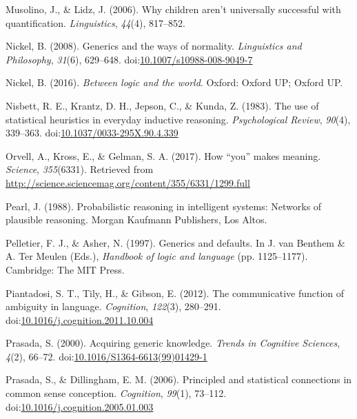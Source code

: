 \documentclass[english,,man,floatsintext]{apa6}
\theoremstyle{definition}
\theoremstyle{definition}
\theoremstyle{definition}
\theoremstyle{remark}
\begin{document}
\leavevmode\hypertarget{ref-Musolino2006}{}%
Musolino, J., \& Lidz, J. (2006). Why children aren't universally
successful with quantification. \emph{Linguistics}, \emph{44}(4),
817--852.

\leavevmode\hypertarget{ref-Nickel2008}{}%
Nickel, B. (2008). Generics and the ways of normality. \emph{Linguistics
and Philosophy}, \emph{31}(6), 629--648.
doi:\href{https://doi.org/10.1007/s10988-008-9049-7}{10.1007/s10988-008-9049-7}

\leavevmode\hypertarget{ref-Nickel2016}{}%
Nickel, B. (2016). \emph{Between logic and the world}. Oxford: Oxford
UP; Oxford UP.

\leavevmode\hypertarget{ref-Nisbett1983}{}%
Nisbett, R. E., Krantz, D. H., Jepson, C., \& Kunda, Z. (1983). The use
of statistical heuristics in everyday inductive reasoning.
\emph{Psychological Review}, \emph{90}(4), 339--363.
doi:\href{https://doi.org/10.1037/0033-295X.90.4.339}{10.1037/0033-295X.90.4.339}

\leavevmode\hypertarget{ref-Orvell2017}{}%
Orvell, A., Kross, E., \& Gelman, S. A. (2017). How ``you'' makes
meaning. \emph{Science}, \emph{355}(6331). Retrieved from
\url{http://science.sciencemag.org/content/355/6331/1299.full}

\leavevmode\hypertarget{ref-pearl1988probabilistic}{}%
Pearl, J. (1988). Probabilistic reasoning in intelligent systems:
Networks of plausible reasoning. Morgan Kaufmann Publishers, Los Altos.

\leavevmode\hypertarget{ref-Pelletier1997}{}%
Pelletier, F. J., \& Asher, N. (1997). Generics and defaults. In J. van
Benthem \& A. Ter Meulen (Eds.), \emph{Handbook of logic and language}
(pp. 1125--1177). Cambridge: The MIT Press.

\leavevmode\hypertarget{ref-Piantadosi2012}{}%
Piantadosi, S. T., Tily, H., \& Gibson, E. (2012). The communicative
function of ambiguity in language. \emph{Cognition}, \emph{122}(3),
280--291.
doi:\href{https://doi.org/10.1016/j.cognition.2011.10.004}{10.1016/j.cognition.2011.10.004}

\leavevmode\hypertarget{ref-Prasada2000}{}%
Prasada, S. (2000). Acquiring generic knowledge. \emph{Trends in
Cognitive Sciences}, \emph{4}(2), 66--72.
doi:\href{https://doi.org/10.1016/S1364-6613(99)01429-1}{10.1016/S1364-6613(99)01429-1}

\leavevmode\hypertarget{ref-Prasada2006}{}%
Prasada, S., \& Dillingham, E. M. (2006). Principled and statistical
connections in common sense conception. \emph{Cognition}, \emph{99}(1),
73--112.
doi:\href{https://doi.org/10.1016/j.cognition.2005.01.003}{10.1016/j.cognition.2005.01.003}
\end{document}
